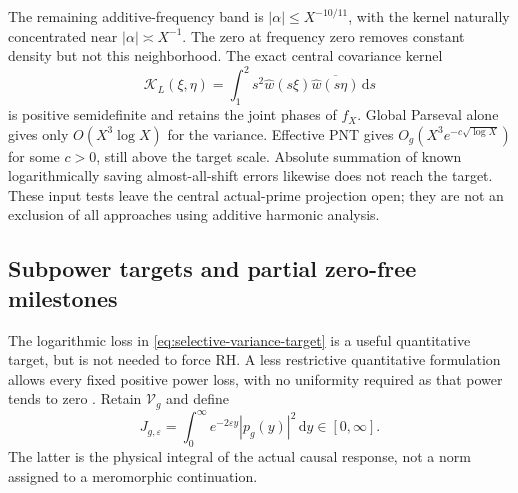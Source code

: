 \documentclass[11pt]{article}
\numberwithin{equation}{section}
\theoremstyle{definition}
\theoremstyle{remark}
\newcommand{\dd}{\,\mathrm d}
\begin{document}
The remaining additive-frequency band is \(|\alpha|\le X^{-10/11}\),
with the kernel naturally concentrated near \(|\alpha|\asymp X^{-1}\).
The zero at frequency zero removes constant density but not this
neighborhood. The exact central covariance kernel
\[
\mathcal K_L(\xi,\eta)=\int_1^2s^2\widehat w(s\xi)
\overline{\widehat w(s\eta)}\dd s
\]
is positive semidefinite and retains the joint phases of \(f_X\).
Global Parseval alone gives only \(O(X^3\log X)\) for the variance.
Effective PNT gives \(O_g(X^3e^{-c\sqrt{\log X}})\) for some \(c>0\), still above
the target scale. Absolute summation of known logarithmically saving
almost-all-shift errors \cite{MRTCorrelations} likewise does not reach the target. These
input tests leave the central actual-prime projection open; they are
not an exclusion of all approaches using additive harmonic analysis.

\subsection{Subpower targets and partial zero-free milestones}
\label{sec:selective-subpower}

The logarithmic loss in \eqref{eq:selective-variance-target} is a
useful quantitative target, but is not needed to force RH. A less
restrictive quantitative formulation allows every fixed positive power
loss, with no uniformity required as that power tends to zero
\cite{SubpowerGrowthNote}. Retain \(\mathcal V_g\) and define
\[
J_{g,\varepsilon}=\int_0^\infty
 e^{-2\varepsilon y}|p_g(y)|^2\dd y\in[0,\infty].
\]
The latter is the physical integral of the actual causal response,
not a norm assigned to a meromorphic continuation.
\end{document}

